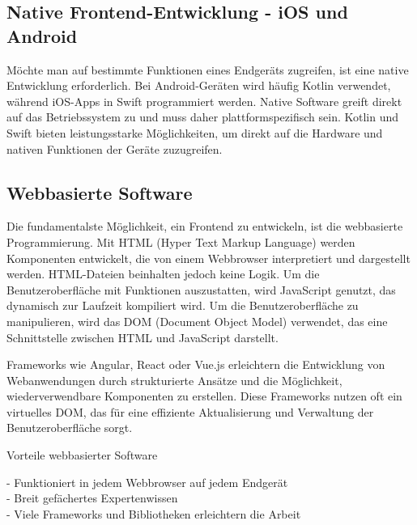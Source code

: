 \vspace{0.5cm}

\subsection{Native Frontend-Entwicklung - iOS und Android}

Möchte man auf bestimmte Funktionen eines Endgeräts zugreifen, ist eine native Entwicklung erforderlich. Bei Android-Geräten wird häufig Kotlin verwendet, während iOS-Apps in Swift programmiert werden. Native Software greift direkt auf das Betriebssystem zu und muss daher plattformspezifisch sein. Kotlin und Swift bieten leistungsstarke Möglichkeiten, um direkt auf die Hardware und nativen Funktionen der Geräte zuzugreifen.

\vspace{0.5cm}

\subsection{Webbasierte Software}

Die fundamentalste Möglichkeit, ein Frontend zu entwickeln, ist die webbasierte Programmierung. Mit HTML (Hyper Text Markup Language) werden Komponenten entwickelt, die von einem Webbrowser interpretiert und dargestellt werden. HTML-Dateien beinhalten jedoch keine Logik. Um die Benutzeroberfläche mit Funktionen auszustatten, wird JavaScript genutzt, das dynamisch zur Laufzeit kompiliert wird. Um die Benutzeroberfläche zu manipulieren, wird das DOM (Document Object Model) verwendet, das eine Schnittstelle zwischen HTML und JavaScript darstellt.

\vspace{0.5cm}

Frameworks wie Angular, React oder Vue.js erleichtern die Entwicklung von Webanwendungen durch strukturierte Ansätze und die Möglichkeit, wiederverwendbare Komponenten zu erstellen. Diese Frameworks nutzen oft ein virtuelles DOM, das für eine effiziente Aktualisierung und Verwaltung der Benutzeroberfläche sorgt.

\vspace{0.5cm}

Vorteile webbasierter Software

- Funktioniert in jedem Webbrowser auf jedem Endgerät \\
- Breit gefächertes Expertenwissen \\
- Viele Frameworks und Bibliotheken erleichtern die Arbeit


